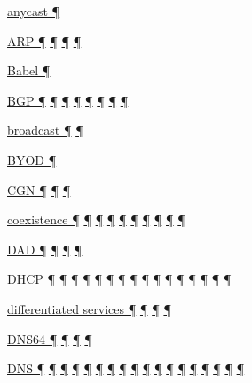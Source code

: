 \documentclass[
]{article}
\begin{document}
\hyperref[addresses]{anycast ¶}

\hyperref[address-resolution]{ARP ¶}
\hyperref[ipv6-primary-differences-from-ipv4]{¶}
\hyperref[layer-2-considerations]{¶} \hyperref[troubleshooting]{¶}

\hyperref[routing]{Babel ¶}

\hyperref[addresses]{BGP ¶} \hyperref[routing]{¶}
\hyperref[filtering]{¶} \hyperref[multi-prefix-operation]{¶}
\hyperref[multihoming]{¶} \hyperref[routing-operation]{¶}
\hyperref[tools]{¶} \hyperref[further-reading]{¶}

\hyperref[managed-configuration]{broadcast ¶}
\hyperref[ipv6-primary-differences-from-ipv4]{¶}

\hyperref[address-and-prefix-management]{BYOD ¶}

\hyperref[dual-stack-scenarios]{CGN ¶} \hyperref[obsolete-techniques]{¶}
\hyperref[tunnels]{¶}

\hyperref[coexistence-with-legacy-ipv4]{coexistence ¶}
\hyperref[dual-stack-scenarios]{¶} \hyperref[obsolete-techniques]{¶}
\hyperref[translation-and-ipv4-as-a-service]{¶} \hyperref[tunnels]{¶}
\hyperref[network-design]{¶} \hyperref[energy-consumption]{¶}
\hyperref[multihoming]{¶} \hyperref[security-operation]{¶}
\hyperref[obsolete-features-in-ipv6]{¶}

\hyperref[address-resolution]{DAD ¶} \hyperref[auto-configuration]{¶}
\hyperref[layer-2-considerations]{¶}
\hyperref[address-and-prefix-management]{¶}

\hyperref[auto-configuration]{DHCP ¶} \hyperref[dns]{¶}
\hyperref[managed-configuration]{¶} \hyperref[routing]{¶}
\hyperref[source-and-destination-address-selection]{¶}
\hyperref[dual-stack-scenarios]{¶}
\hyperref[ipv6-primary-differences-from-ipv4]{¶} \hyperref[filtering]{¶}
\hyperref[layer-2-considerations]{¶} \hyperref[address-planning]{¶}
\hyperref[prefix-per-host]{¶}
\hyperref[address-and-prefix-management]{¶}
\hyperref[multi-prefix-operation]{¶} \hyperref[cern-and-the-lhc]{¶}
\hyperref[troubleshooting]{¶} \hyperref[advanced-troubleshooting]{¶}

\hyperref[packet-format]{differentiated services ¶}
\hyperref[routing]{¶} \hyperref[traffic-class-and-flow-label]{¶}
\hyperref[transport-protocols]{¶}

\hyperref[dual-stack-scenarios]{DNS64 ¶}
\hyperref[translation-and-ipv4-as-a-service]{¶}
\hyperref[advanced-troubleshooting]{¶} \hyperref[tools]{¶}

\hyperref[how-an-application-programmer-sees-ipv6]{DNS ¶}
\hyperref[addresses]{¶} \hyperref[auto-configuration]{¶}
\hyperref[dns]{¶} \hyperref[managed-configuration]{¶}
\hyperref[dual-stack-scenarios]{¶}
\hyperref[translation-and-ipv4-as-a-service]{¶}
\hyperref[management-and-operations]{¶}
\hyperref[address-and-prefix-management]{¶}
\hyperref[benchmarking-and-monitoring]{¶}
\hyperref[multi-prefix-operation]{¶} \hyperref[multihoming]{¶}
\hyperref[deployment-in-the-enterprise]{¶}
\hyperref[deployment-in-the-home]{¶} \hyperref[status]{¶}
\hyperref[troubleshooting]{¶} \hyperref[advanced-troubleshooting]{¶}
\hyperref[tools]{¶}
\end{document}
